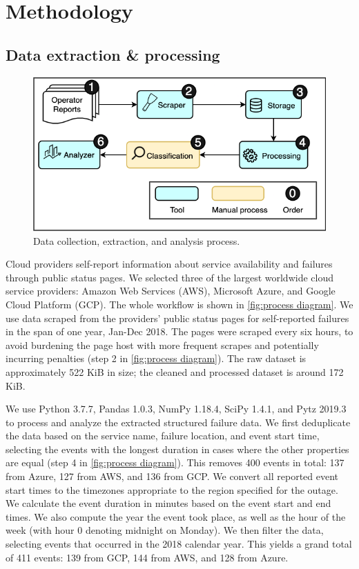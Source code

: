 \section{Methodology}
\subsection{Data extraction \& processing}

\begin{figure}[h]
  \centering
  \includegraphics[scale=0.5]{diagrams/process.png}
  \caption{Data collection, extraction, and analysis process.}
  \label{fig:process diagram}
\end{figure}
Cloud providers self-report information about service availability and failures through public status pages.
We selected three of the largest worldwide cloud service providers: Amazon Web Services (AWS), Microsoft Azure, and Google Cloud Platform (GCP).
The whole workflow is shown in \autoref{fig:process diagram}.
We use data scraped from the providers' public status pages for self-reported failures \cite{awsFeed, gcpFeed, azureFeed} in the span of one year, Jan-Dec 2018.
The pages were scraped every six hours, to avoid burdening the page host with more frequent scrapes and potentially incurring penalties (step 2 in \autoref{fig:process diagram}).
The raw dataset is approximately 522 KiB in size; the cleaned and processed dataset is around 172 KiB.

We use Python 3.7.7, Pandas 1.0.3, NumPy 1.18.4, SciPy 1.4.1, and Pytz 2019.3 to process and analyze the extracted structured failure data.
We first deduplicate the data based on the service name, failure location, and event start time, selecting the events with the longest duration in cases where the other properties are equal (step 4 in \autoref{fig:process diagram}).
This removes 400 events in total: 137 from Azure, 127 from AWS, and 136 from GCP.
We convert all reported event start times to the timezones appropriate to the region specified for the outage.
We calculate the event duration in minutes based on the event start and end times.
We also compute the year the event took place, as well as the hour of the week (with hour 0 denoting midnight on Monday).
We then filter the data, selecting events that occurred in the 2018 calendar year.
This yields a grand total of 411 events: 139 from GCP, 144 from AWS, and 128 from Azure.

